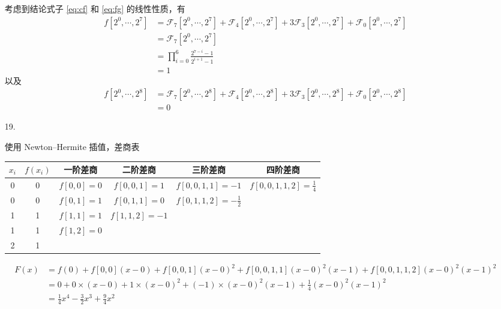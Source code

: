 \documentclass{sjtuarticle}
\begin{document}
\begin{itemize}
\begin{solution}
        考虑到结论式子 \eqref{eq:cf} 和 \eqref{eq:fg} 的线性性质，有
        \begin{align*}
            f[2^0,\cdots,2^7]&=\mathcal{F}_7[2^0,\cdots,2^7]+\mathcal{F}_4[2^0,\cdots,2^7]+3\mathcal{F}_3[2^0,\cdots,2^7]+\mathcal{F}_0[2^0,\cdots,2^7]\\
            &=\mathcal{F}_7[2^0,\cdots,2^7]\\
            &=\prod_{i=0}^{6}\frac{2^{7-i}-1}{2^{i+1}-1}\\
            &=1
        \end{align*}
        以及
        \begin{align*}
            f[2^0,\cdots,2^8]&=\mathcal{F}_7[2^0,\cdots,2^8]+\mathcal{F}_4[2^0,\cdots,2^8]+3\mathcal{F}_3[2^0,\cdots,2^8]+\mathcal{F}_0[2^0,\cdots,2^8]\\
            &=0
        \end{align*}
    \end{solution}
    \item[19.] \begin{solution}
        使用 Newton--Hermite 插值，差商表
        \begin{table}[H]
            \centering
            \begin{tabular}{cccccc}
                \toprule
                $x_i$ & $f(x_i)$ & 一阶差商 & 二阶差商 & 三阶差商 & 四阶差商 \\
                \midrule
                0 & 0 & $f[0,0]=0$ & $f[0,0,1]=1$ & $f[0,0,1,1]=-1$ & $f[0,0,1,1,2]=\frac{1}{4}$\\
                0 & 0 & $f[0,1]=1$ & $f[0,1,1]=0$ & $f[0,1,1,2]=-\frac{1}{2}$\\ 
                1 & 1 & $f[1,1]=1$ & $f[1,1,2]=-1$ & \\
                1 & 1 & $f[1,2]=0$ & \\
                2 & 1 & \\
                \bottomrule
            \end{tabular}
        \end{table}        
        \begin{align*}
            F(x)&=f(0)+f[0,0](x-0)+f[0,0,1](x-0)^2+f[0,0,1,1](x-0)^2(x-1)+f[0,0,1,1,2](x-0)^2(x-1)^2\\
            &=0+0\times (x-0)+1\times (x-0)^2+(-1)\times (x-0)^2(x-1)+\frac{1}{4}(x-0)^2(x-1)^2\\
            &=\frac{1}{4}x^4-\frac{3}{2}x^3+\frac{9}{4}x^2
        \end{align*}

\end{solution}
\end{itemize}
\end{document}

